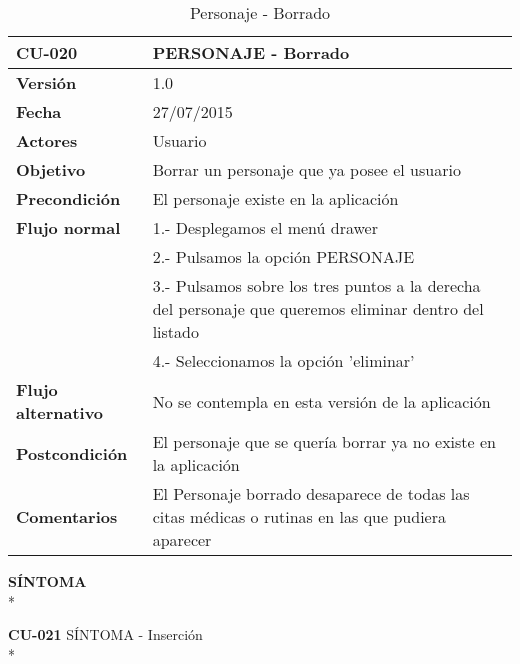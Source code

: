 \documentclass[../pfc.tex]{subfiles}
\begin{document}
		\begin{table}[H]
			\centering
			\begin{tabular}[t]{|p{3cm}|p{9.5cm}|}
				\hline \textbf{CU-020} & \textbf{PERSONAJE - Borrado} \\*
				\hline\hline \textbf{Versión} & 1.0 \\*
				\hline\hline \textbf{Fecha} & 27/07/2015 \\*
				\hline\textbf{Actores} 	& Usuario\\*
				\hline \textbf{Objetivo} & Borrar un personaje que ya posee el usuario\\* 			
				\hline \textbf{Precondición} & El personaje existe en la aplicación\\* 
				\hline \textbf{Flujo normal} & 1.- Desplegamos el menú drawer \\* 
				& 2.- Pulsamos la opción PERSONAJE\\*	
				& 3.- Pulsamos sobre los tres puntos a la derecha del personaje que queremos eliminar dentro del listado\\*	
				& 4.- Seleccionamos la opción 'eliminar'\\*	
				\hline \textbf{Flujo alternativo} & No se contempla en esta versión de la aplicación \\* 
				\hline \textbf{Postcondición} & El personaje que se quería borrar ya no existe en la aplicación \\* 
				\hline \textbf{Comentarios}   & El Personaje borrado desaparece de todas las citas médicas o rutinas en las que pudiera aparecer\\*
				\hline
			\end{tabular}
			\caption{Personaje - Borrado}
			\label{tabla:caso020}
		\end{table}
		
		
		
	\textbf{SÍNTOMA}\\*
	
	\textbf{CU-021}	SÍNTOMA - Inserción\\*
	
\end{document}
